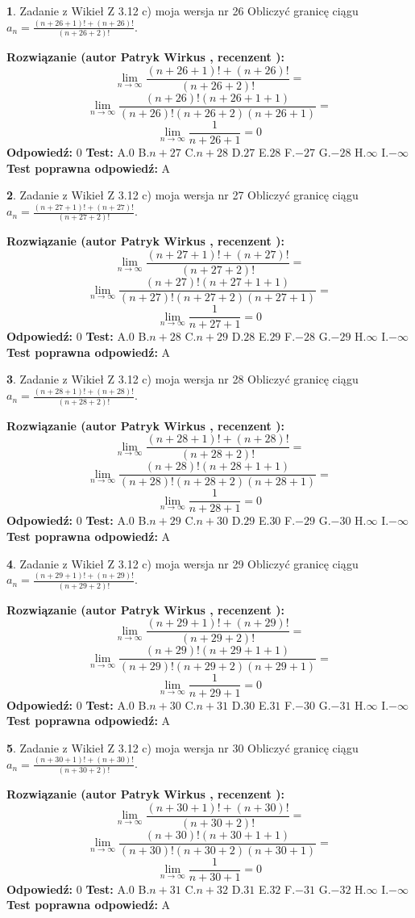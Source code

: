 \documentclass[12pt, a4paper]{article}
\theoremstyle{definition} %
\newtheorem{zad}{}
\newcommand{\zadStart}[1]{\begin{zad}#1\newline}
\newcommand{\zadStop}{\end{zad}}
\newcommand{\rozwStart}[2]{\noindent \textbf{Rozwiązanie (autor #1 , recenzent #2): }\newline}
\newcommand{\rozwStop}{\newline}
\newcommand{\odpStart}{\noindent \textbf{Odpowiedź:}\newline}
\newcommand{\odpStop}{\newline}
\newcommand{\testStart}{\noindent \textbf{Test:}\newline}
\newcommand{\testStop}{\newline}
\newcommand{\kluczStart}{\noindent \textbf{Test poprawna odpowiedź:}\newline}
\newcommand{\kluczStop}{\newline}
\begin{document}
\zadStart{Zadanie z Wikieł Z 3.12 c) moja wersja nr 26}
Obliczyć granicę ciągu $a_{n}=\frac{(n+26+1)!+(n+26)!}{(n+26+2)!}$.
\zadStop
\rozwStart{Patryk Wirkus}{}
$$\lim\limits_{n\to\infty}\frac{(n+26+1)!+(n+26)!}{(n+26+2)!}=$$
$$\lim\limits_{n\to\infty}\frac{(n+26)!(n+26+1+1)}{(n+26)!(n+26+2)(n+26+1)}=$$
$$\lim\limits_{n\to\infty}\frac{1}{n+26+1}= 0$$
\rozwStop
\odpStart
$0$
\odpStop
\testStart
A.$0$
B.$n+27$
C.$n+28$
D.$27$
E.$28$
F.$-27$
G.$-28$
H.$\infty$
I.$-\infty$
\testStop
\kluczStart
A
\kluczStop



\zadStart{Zadanie z Wikieł Z 3.12 c) moja wersja nr 27}
Obliczyć granicę ciągu $a_{n}=\frac{(n+27+1)!+(n+27)!}{(n+27+2)!}$.
\zadStop
\rozwStart{Patryk Wirkus}{}
$$\lim\limits_{n\to\infty}\frac{(n+27+1)!+(n+27)!}{(n+27+2)!}=$$
$$\lim\limits_{n\to\infty}\frac{(n+27)!(n+27+1+1)}{(n+27)!(n+27+2)(n+27+1)}=$$
$$\lim\limits_{n\to\infty}\frac{1}{n+27+1}= 0$$
\rozwStop
\odpStart
$0$
\odpStop
\testStart
A.$0$
B.$n+28$
C.$n+29$
D.$28$
E.$29$
F.$-28$
G.$-29$
H.$\infty$
I.$-\infty$
\testStop
\kluczStart
A
\kluczStop



\zadStart{Zadanie z Wikieł Z 3.12 c) moja wersja nr 28}
Obliczyć granicę ciągu $a_{n}=\frac{(n+28+1)!+(n+28)!}{(n+28+2)!}$.
\zadStop
\rozwStart{Patryk Wirkus}{}
$$\lim\limits_{n\to\infty}\frac{(n+28+1)!+(n+28)!}{(n+28+2)!}=$$
$$\lim\limits_{n\to\infty}\frac{(n+28)!(n+28+1+1)}{(n+28)!(n+28+2)(n+28+1)}=$$
$$\lim\limits_{n\to\infty}\frac{1}{n+28+1}= 0$$
\rozwStop
\odpStart
$0$
\odpStop
\testStart
A.$0$
B.$n+29$
C.$n+30$
D.$29$
E.$30$
F.$-29$
G.$-30$
H.$\infty$
I.$-\infty$
\testStop
\kluczStart
A
\kluczStop



\zadStart{Zadanie z Wikieł Z 3.12 c) moja wersja nr 29}
Obliczyć granicę ciągu $a_{n}=\frac{(n+29+1)!+(n+29)!}{(n+29+2)!}$.
\zadStop
\rozwStart{Patryk Wirkus}{}
$$\lim\limits_{n\to\infty}\frac{(n+29+1)!+(n+29)!}{(n+29+2)!}=$$
$$\lim\limits_{n\to\infty}\frac{(n+29)!(n+29+1+1)}{(n+29)!(n+29+2)(n+29+1)}=$$
$$\lim\limits_{n\to\infty}\frac{1}{n+29+1}= 0$$
\rozwStop
\odpStart
$0$
\odpStop
\testStart
A.$0$
B.$n+30$
C.$n+31$
D.$30$
E.$31$
F.$-30$
G.$-31$
H.$\infty$
I.$-\infty$
\testStop
\kluczStart
A
\kluczStop



\zadStart{Zadanie z Wikieł Z 3.12 c) moja wersja nr 30}
Obliczyć granicę ciągu $a_{n}=\frac{(n+30+1)!+(n+30)!}{(n+30+2)!}$.
\zadStop
\rozwStart{Patryk Wirkus}{}
$$\lim\limits_{n\to\infty}\frac{(n+30+1)!+(n+30)!}{(n+30+2)!}=$$
$$\lim\limits_{n\to\infty}\frac{(n+30)!(n+30+1+1)}{(n+30)!(n+30+2)(n+30+1)}=$$
$$\lim\limits_{n\to\infty}\frac{1}{n+30+1}= 0$$
\rozwStop
\odpStart
$0$
\odpStop
\testStart
A.$0$
B.$n+31$
C.$n+32$
D.$31$
E.$32$
F.$-31$
G.$-32$
H.$\infty$
I.$-\infty$
\testStop
\kluczStart
A
\kluczStop
\end{document}
